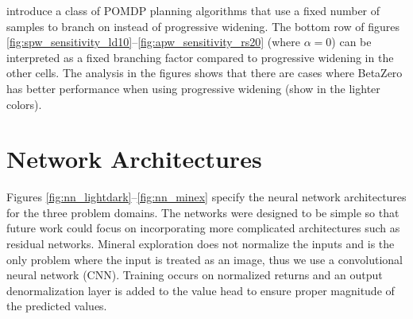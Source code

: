\citeauthor{lim2023optimality} introduce a class of POMDP planning algorithms that use a fixed number of samples to branch on instead of progressive widening.
The bottom row of figures \ref{fig:spw_sensitivity_ld10}--\ref{fig:apw_sensitivity_rs20} (where $\alpha = 0$) can be interpreted as a fixed branching factor compared to progressive widening in the other cells. The analysis in the figures shows that there are cases where BetaZero has better performance when using progressive widening (show in the lighter colors).


\begin{figure*}[ht!]
    \centering
    \begin{minipage}{0.22\textwidth}
        \resizebox{\textwidth}{!}{%
            
        }
    \end{minipage}
    \hfill
    \begin{minipage}{0.27\textwidth}
        \resizebox{\textwidth}{!}{%
            
        }
    \end{minipage}
    \hfill
    \begin{minipage}{0.25\textwidth}
        \resizebox{\textwidth}{!}{%
            
        }
    \end{minipage}

    \begin{minipage}[t]{0.22\textwidth}
        \caption{Light dark neural network architecture.}
        \label{fig:nn_lightdark}
    \end{minipage}
    \hfill
    \begin{minipage}[t]{0.27\textwidth}
        \caption{Rock sample neural network architecture.}
        \label{fig:nn_rocksample}
    \end{minipage}
    \hfill
    \begin{minipage}[t]{0.25\textwidth}
        \caption{Mineral exploration CNN architecture.}
        \label{fig:nn_minex}
    \end{minipage}
\end{figure*}


\section*{Network Architectures}

Figures \ref{fig:nn_lightdark}--\ref{fig:nn_minex} specify the neural network architectures for the three problem domains.
The networks were designed to be simple so that future work could focus on incorporating more complicated architectures such as residual networks.
Mineral exploration does not normalize the inputs and is the only problem where the input is treated as an image, thus we use a convolutional neural network (CNN).
Training occurs on normalized returns and an output denormalization layer is added to the value head to ensure proper magnitude of the predicted values.


